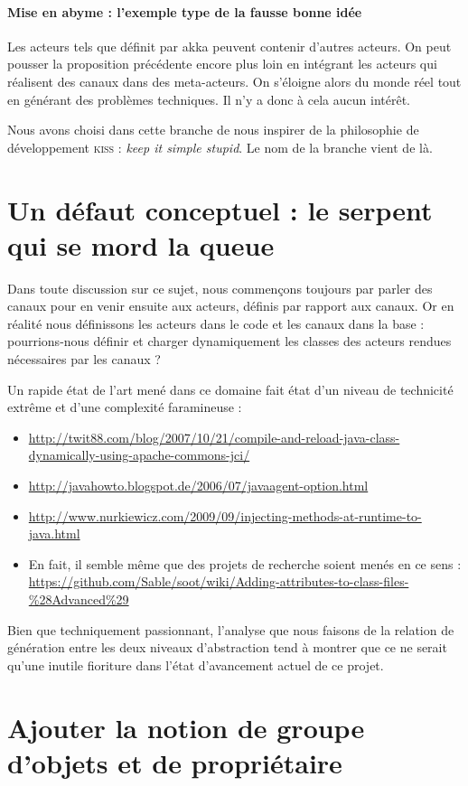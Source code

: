 \documentclass[11pt]{article}
\begin{document}
\paragraph{Mise en abyme : l'exemple type de la fausse bonne idée} Les acteurs tels que définit par akka peuvent contenir d'autres acteurs. On peut pousser la proposition précédente encore plus loin en intégrant les acteurs qui réalisent des canaux dans des meta-acteurs. On s'éloigne alors du monde réel tout en générant des problèmes techniques. Il n'y a donc à cela aucun intérêt.

Nous avons choisi dans cette branche de nous inspirer de la \og philosophie de développement \fg{} \textsc{kiss} : \textsl{keep it simple stupid}. Le nom de la branche vient de là.

\section{Un défaut conceptuel : le serpent qui se mord la queue}

Dans toute discussion sur ce sujet, nous commençons toujours par parler des canaux pour en venir ensuite aux acteurs, définis par rapport aux canaux. Or en réalité nous définissons les acteurs dans le code et les canaux dans la base : pourrions-nous définir et charger dynamiquement les classes des acteurs rendues nécessaires par les canaux ?

Un rapide état de l'art mené dans ce domaine fait état d'un niveau de technicité extrême et d'une complexité faramineuse :
\begin{itemize}
\item \url{http://twit88.com/blog/2007/10/21/compile-and-reload-java-class-dynamically-using-apache-commons-jci/}
\item \url{http://javahowto.blogspot.de/2006/07/javaagent-option.html}
\item \url{http://www.nurkiewicz.com/2009/09/injecting-methods-at-runtime-to-java.html}
\item En fait, il semble même que des projets de recherche soient menés en ce sens : \url{https://github.com/Sable/soot/wiki/Adding-attributes-to-class-files-\%28Advanced\%29}
\end{itemize}
Bien que techniquement passionnant, l'analyse que nous faisons de la relation de génération entre les deux niveaux d'abstraction tend à montrer que ce ne serait qu'une inutile fioriture dans l'état d'avancement actuel de ce projet.

\section{Ajouter la notion de groupe d'objets et de propriétaire}
\end{document}
